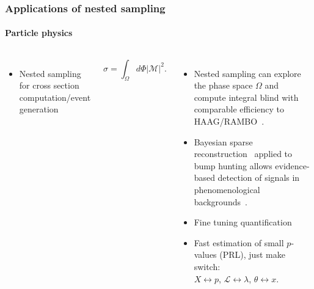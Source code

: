 \documentclass[aspectratio=169]{beamer}
\begin{document}
\begin{frame}
    \frametitle{Applications of nested sampling}
    \framesubtitle{Particle physics}
    \begin{columns}
        \begin{columns}
            \begin{itemize}
                \item Nested sampling for cross section computation/event generation
            \end{itemize}
            \[\sigma = \int_\Omega d\Phi |\mathcal{M}|^2.\]
        \end{columns}
        \begin{itemize}
            \item Nested sampling can explore the phase space $\Omega$ and compute integral blind with comparable efficiency to HAAG/RAMBO~.
            \item Bayesian sparse reconstruction~ applied to bump hunting allows evidence-based detection of signals in phenomenological backgrounds~.
            \item Fine tuning quantification
            \item Fast estimation of small $p$-values (PRL), just make switch:\\ $X\leftrightarrow p$, $\mathcal{L}\leftrightarrow\lambda$, $\theta \leftrightarrow x$.


\end{itemize}
\end{columns}
\end{frame}
\end{document}
